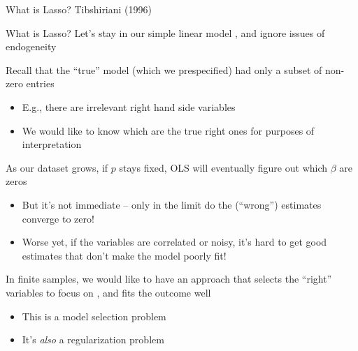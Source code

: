 \documentclass[notes,11pt, aspectratio=169]{beamer}
\newenvironment{wideitemize}{\itemize\addtolength{\itemsep}{10pt}}{\enditemize}
\begin{document}
\begin{frame}{What is Lasso? Tibshiriani (1996)}
  \begin{wideitemize}
  \item What is Lasso?  Let's stay in our simple linear model , and
    ignore issues of endogeneity
  \item Recall that the ``true'' model (which we prespecified) had only a subset of non-zero entries
    \begin{itemize}
    \item E.g., there are irrelevant right hand side variables
    \item We would like to know which are the true right ones for purposes of interpretation
    \end{itemize}
  \item As our dataset grows, if $p$ stays fixed, OLS will eventually
    figure out which $\beta$ are zeros
    \begin{itemize}
    \item But it's not immediate -- only in the limit do the
      (``wrong'') estimates converge to zero!
    \item Worse yet, if the variables are correlated or noisy, it's
      hard to get good estimates that don't make the model poorly fit!
    \end{itemize}
  \item In finite samples, we would like to have an approach that
    selects the ``right'' variables to focus on , and fits the outcome well
    \begin{itemize}
    \item This is a model selection problem
    \item It's \emph{also} a regularization problem
    \end{itemize}
  \end{wideitemize}
\end{frame}
\end{document}
